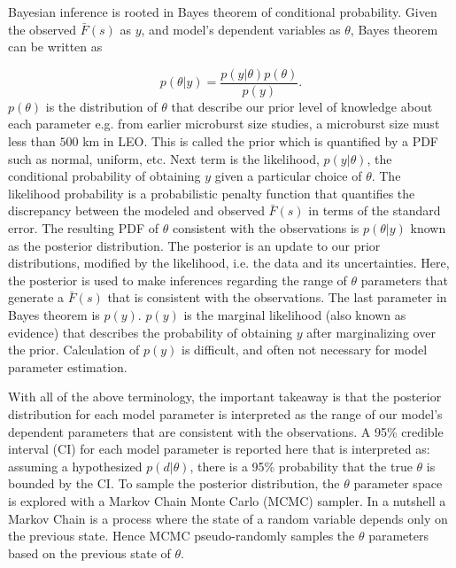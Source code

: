 \documentclass[draft]{agujournal2019}
\begin{document}
Bayesian inference is rooted in Bayes theorem of conditional probability. Given the observed $\bar{F}(s)$ as $y$, and model's dependent variables as $\theta$, Bayes theorem can be written as

\begin{equation}
p(\theta | y) = \frac{p(y | \theta) p(\theta)}{p(y)}.
\end{equation} $p(\theta)$ is the distribution of $\theta$ that describe our prior level of knowledge about each parameter e.g. from earlier microburst size studies, a microburst size must less than $500$ km in LEO. This is called the prior which is quantified by a PDF such as normal, uniform, etc. Next term is the likelihood, $p(y | \theta)$, the conditional probability of obtaining $y$ given a particular choice of $\theta$. The likelihood probability is a probabilistic penalty function that quantifies the discrepancy between the modeled and observed $\bar{F}(s)$ in terms of the standard error. The resulting PDF of $\theta$ consistent with the observations is $p(\theta | y)$ known as the posterior distribution. The posterior is an update to our prior distributions, modified by the likelihood, i.e. the data and its uncertainties. Here, the posterior is used to make inferences regarding the range of $\theta$ parameters that generate a $\bar{F}(s)$ that is consistent with the observations. The last parameter in Bayes theorem is $p(y)$. $p(y)$ is the marginal likelihood (also known as evidence) that describes the probability of obtaining $y$ after marginalizing over the prior. Calculation of $p(y)$ is difficult, and often not necessary for model parameter estimation. 

With all of the above terminology, the important takeaway is that the posterior distribution for each model parameter is interpreted as the range of our model's dependent parameters that are consistent with the observations. A 95\% credible interval (CI) for each model parameter is reported here that is interpreted as: assuming a hypothesized $p(d | \theta)$, there is a 95\% probability that the true $\theta$ is bounded by the CI. To sample the posterior distribution, the $\theta$ parameter space is explored with a Markov Chain Monte Carlo (MCMC) sampler. In a nutshell a Markov Chain is a process where the state of a random variable depends only on the previous state. Hence MCMC pseudo-randomly samples the $\theta$ parameters based on the previous state of $\theta$. 
\end{document}
